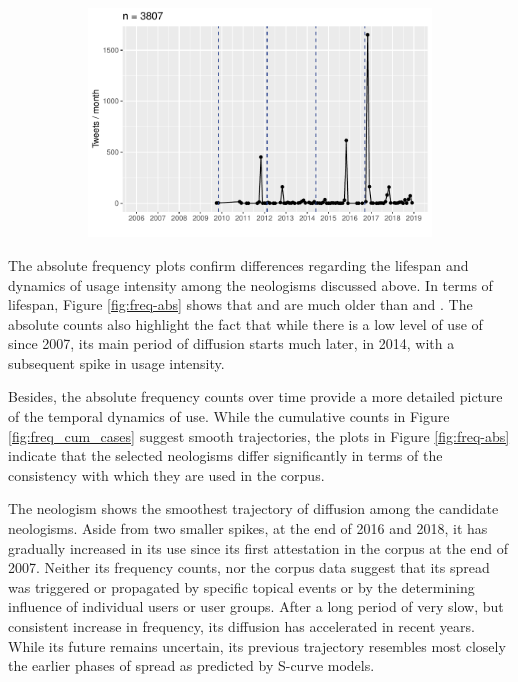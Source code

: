 \documentclass[
  a4paper,
  abstract=on,
  captions=tableabove
  ]{scrartcl}
\begin{document}
\begin{figure}
\begin{subfigure}{.3\linewidth}
          \includegraphics[width=\linewidth, height=.8\textheight, keepaspectratio]{"img/ui_poppygate_time.pdf"}
        \end{subfigure}
      \end{figure}

      The absolute frequency plots confirm differences regarding the lifespan and dynamics of usage intensity among the neologisms discussed above. In terms of lifespan, Figure \ref{fig:freq-abs} shows that  and  are much older than  and . The absolute counts also highlight the fact that while there is a low level of use of  since 2007, its main period of diffusion starts much later, in 2014, with a subsequent spike in usage intensity.


        Besides, the absolute frequency counts over time provide a more detailed picture of the temporal dynamics of use. While the cumulative counts in Figure \ref{fig:freq_cum_cases} suggest smooth trajectories, the plots in Figure \ref{fig:freq-abs} indicate that the selected neologisms differ significantly in terms of the consistency with which they are used in the corpus.

        The neologism  shows the smoothest trajectory of diffusion among the candidate neologisms. Aside from two smaller spikes, at the end of 2016 and 2018, it has gradually increased in its use since its first attestation in the corpus at the end of 2007. Neither its frequency counts, nor the corpus data suggest that its spread was triggered or propagated by specific topical events or by the determining influence of individual users or user groups. After a long period of very slow, but consistent increase in frequency, its diffusion has accelerated in recent years. While its future remains uncertain, its previous trajectory resembles most closely the earlier phases of spread as predicted by S-curve models.
\end{document}
